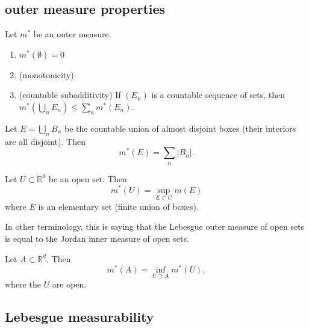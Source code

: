 \documentclass[12pt]{article}
\begin{document}
\subsection{outer measure properties}

\begin{proposition} Let $m^\ast$ be an outer measure. \hfill
	\begin{enumerate}
		\item $m^\ast(\emptyset)=0$
		\item (monotonicity)
		\item (countable subadditivity) If $(E_n)$ is a countable sequence of sets, then $m^\ast(\bigcup_n E_n) \leq \sum_n m^\ast(E_n)$.
	\end{enumerate}
\end{proposition}

\begin{proposition}
	Let $E=\bigcup_n B_n$ be the countable union of almost disjoint boxes (their interiors are all disjoint). Then
	\begin{equation*}
		m^\ast(E)=\sum_n |B_n|.
	\end{equation*}
\end{proposition}

\begin{proposition} Let $U\subset \mathbb{R}^d$ be an open set. Then 
	\begin{equation*}
		m^\ast(U)=\sup_{E\subset U}m(E)
	\end{equation*}
	where $E$ is an elementary set (finite union of boxes).
\end{proposition}

In other terminology, this is saying that the Lebesgue outer measure of open sets is equal to the Jordan inner measure of open sets.

\begin{proposition}
	Let $A\subset \mathbb{R}^d$. Then 
	\begin{equation*}
		m^\ast(A)=\inf_{U\supset A} m^\ast(U),
	\end{equation*}
	where the $U$ are open.
\end{proposition}

\subsection{Lebesgue measurability}
\end{document}

